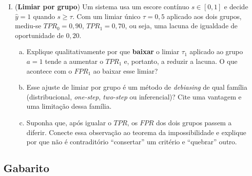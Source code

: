 \documentclass{dlproblemset}
\begin{document}
\begin{enumerate}[I)]
    \item {} (\textbf{Limiar por grupo}) Um sistema usa um escore contínuo $s \in [0,1]$ e decide $\hat{y}{=}1$ quando $s \geq \tau$. Com um limiar único $\tau = 0{,}5$ aplicado aos dois grupos, mediu-se $TPR_0 = 0{,}90$, $TPR_1 = 0{,}70$, ou seja, uma lacuna de igualdade de oportunidade de $0{,}20$.
    \begin{enumerate}[(a)]
        \item Explique qualitativamente por que \textbf{baixar} o limiar $\tau_1$ aplicado ao grupo $a{=}1$ tende a aumentar o $TPR_1$ e, portanto, a reduzir a lacuna. O que acontece com o $FPR_1$ ao baixar esse limiar?
        \item Esse ajuste de limiar por grupo é um método de \textit{debiasing} de qual família (distribucional, \textit{one-step}, \textit{two-step} ou inferencial)? Cite uma vantagem e uma limitação dessa família.
        \item Suponha que, após igualar o $TPR$, os $FPR$ dos dois grupos passem a diferir. Conecte essa observação ao teorema da impossibilidade e explique por que não é contraditório ``consertar'' um critério e ``quebrar'' outro.
    \end{enumerate}

\end{enumerate}

\newpage
\subsection*{Gabarito}
\color{blue}
\end{document}
